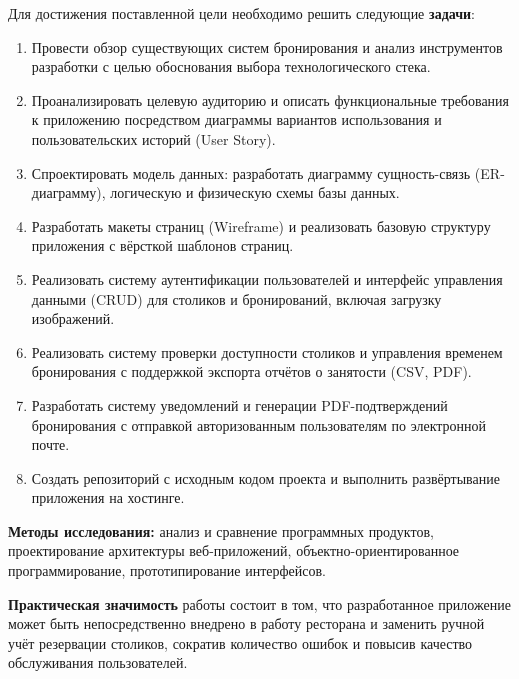 Для достижения поставленной цели необходимо решить следующие
\textbf{задачи}:
\begin{enumerate}
    \item Провести обзор существующих систем бронирования и анализ
          инструментов разработки с целью обоснования выбора
          технологического стека.
    \item Проанализировать целевую аудиторию и описать функциональные
          требования к приложению посредством диаграммы вариантов
          использования и пользовательских историй (User Story).
    \item Спроектировать модель данных: разработать диаграмму
          сущность-связь (ER-диаграмму), логическую и физическую схемы
          базы данных.
    \item Разработать макеты страниц (Wireframe) и реализовать базовую
          структуру приложения с вёрсткой шаблонов страниц.
    \item Реализовать систему аутентификации пользователей и интерфейс
          управления данными (CRUD) для столиков и бронирований,
          включая загрузку изображений.
    \item Реализовать систему проверки доступности столиков и управления
          временем бронирования с поддержкой экспорта отчётов о
          занятости (CSV, PDF).
    \item Разработать систему уведомлений и генерации
          PDF-подтверждений бронирования с отправкой авторизованным пользователям по
          электронной почте.
    \item Создать репозиторий с исходным кодом проекта и выполнить
          развёртывание приложения на хостинге.
\end{enumerate}

\textbf{Методы исследования:} анализ и сравнение программных продуктов,
проектирование архитектуры веб-приложений, объектно-ориентированное
программирование, прототипирование интерфейсов.

\textbf{Практическая значимость} работы состоит в том, что разработанное
приложение может быть непосредственно внедрено в работу ресторана и
заменить ручной учёт резервации столиков, сократив количество ошибок и
повысив качество обслуживания пользователей.
